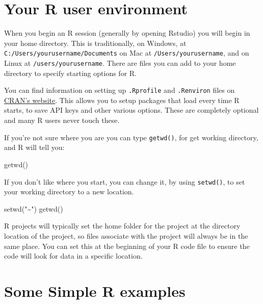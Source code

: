 \documentclass[
]{book}
\newenvironment{Shaded}{\begin{snugshade}}{\end{snugshade}}
\newcommand{\FunctionTok}[1]{\textcolor[rgb]{0.00,0.00,0.00}{#1}}
\newcommand{\NormalTok}[1]{#1}
\newcommand{\StringTok}[1]{\textcolor[rgb]{0.31,0.60,0.02}{#1}}
\begin{document}
\hypertarget{your-r-user-environment}{%
\section{Your R user environment}\label{your-r-user-environment}}

When you begin an R session (generally by opening Rstudio) you will
begin in your home directory. This is traditionally, on Windows, at
\texttt{\textquotesingle{}C:/Users/yourusername/Documents\textquotesingle{}} on Mac at \texttt{\textquotesingle{}/Users/yourusername\textquotesingle{}},
and on Linux at \texttt{\textquotesingle{}/users/yourusername\textquotesingle{}}. There are files you can add to
your home directory to specify starting options for R.

You can find information on setting up \texttt{.Rprofile} and \texttt{.Renviron} files
on \href{https://cran.r-project.org/web/packages/startup/vignettes/startup-intro.html}{CRAN's
website}.
This allows you to setup packages that load every time R starts, to save
API keys and other various options. These are completely optional and
many R users never touch these.

If you're not sure where you are you can type \texttt{getwd()}, for get working
directory, and R will tell you:

\begin{Shaded}
\begin{Highlighting}[]
\FunctionTok{getwd}\NormalTok{()}
\end{Highlighting}
\end{Shaded}

If you don't like where you start, you can change it, by using
\texttt{setwd()}, to set your working directory to a new location.

\begin{Shaded}
\begin{Highlighting}[]
\FunctionTok{setwd}\NormalTok{(}\StringTok{"\textasciitilde{}"}\NormalTok{)}
\FunctionTok{getwd}\NormalTok{()}
\end{Highlighting}
\end{Shaded}

R projects will typically set the home folder for the project at the
directory location of the project, so files associate with the project
will always be in the same place. You can set this at the beginning of
your R code file to ensure the code will look for data in a specific
location.

\hypertarget{some-simple-r-examples}{%
\section{Some Simple R examples}\label{some-simple-r-examples}}
\end{document}
